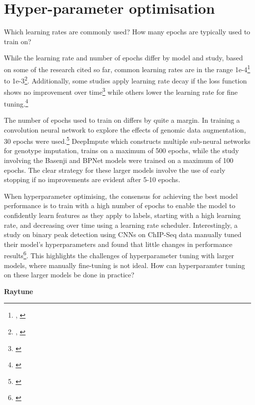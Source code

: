 \documentclass[
]{book}
\begin{document}
\section{Hyper-parameter optimisation}\label{hyper-parameter-optimisation}

Which learning rates are commonly used? How many epochs are typically used to train on?

While the learning rate and number of epochs differ by model and study, based on some of the research cited so far, common learning rates are in the range 1e-4\footnote{\citep{cedric2019}, \citep{avsec2021}} to 1e-3\footnote{\citep{cao2019}, \citep{toneyan2022}}. Additionally, some studies apply learning rate decay if the loss function shows no improvement over time\footnote{\citet{toneyan2022}} while others lower the learning rate for fine tuning.\footnote{\citet{avsec2021}}

The number of epochs used to train on differs by quite a margin. In training a convolution neural network to explore the effects of genomic data augmentation, 30 epochs were used.\footnote{\citet{cao2019}} DeepImpute which constructs multiple sub-neural networks for genotype imputation, trains on a maximum of 500 epochs, while the study involving the Basenji and BPNet models were trained on a maximum of 100 epochs. The clear strategy for these larger models involve the use of early stopping if no improvements are evident after 5-10 epochs.

When hyperparameter optimising, the consensus for achieving the best model performance is to train with a high number of epochs to enable the model to confidently learn features as they apply to labels, starting with a high learning rate, and decreasing over time using a learning rate scheduler. Interestingly, a study on binary peak detection using CNNs on ChIP-Seq data manually tuned their model's hyperparameters and found that little changes in performance results\footnote{\citet{oh2020}}. This highlights the challenges of hyperparameter tuning with larger models, where manually fine-tuning is not ideal. How can hyperparamter tuning on these larger models be done in practice?

\textbf{Raytune}
\end{document}
